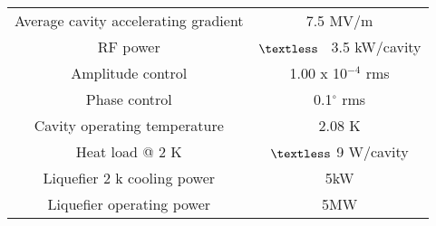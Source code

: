 \begin{table}
\begin{minipage}{\textwidth}
\begin{center}
\begin{singlespacing}
\begin{tabular}{c|c}
Average cavity accelerating gradient  & 7.5 MV/m \\
RF power  & $\textless$ \ 3.5 kW/cavity \\
Amplitude control  & 1.00 x 10$^{-4}$ rms \\
Phase control  & 0.1$^\circ$ rms \\
Cavity operating temperature  &  2.08 K\\
Heat load @ 2 K  &  $\textless$ 9 W/cavity\\
Liquefier 2 k cooling power  & 5kW \\
Liquefier operating power  &  5MW\\




\hline \hline

\end{tabular}

\end{singlespacing}
\end{center}
\end{minipage}
\end{table}
\vspace{20pt}